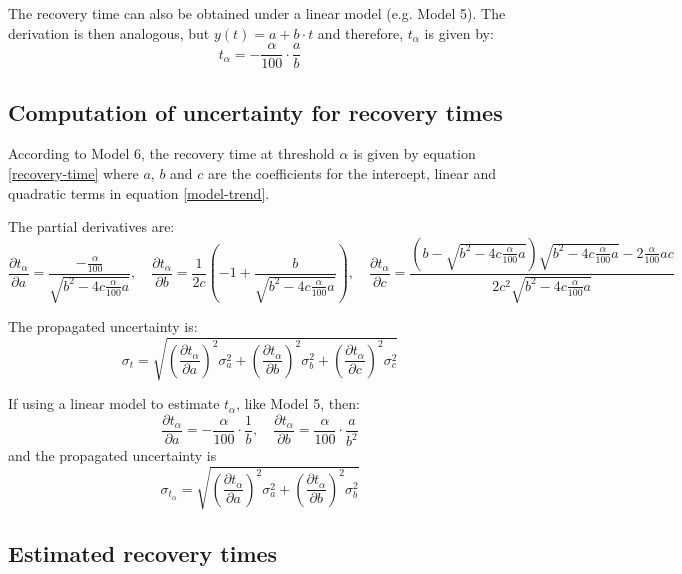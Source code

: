 \documentclass[fleqn,10pt]{wlscirep}
\begin{document}
The recovery time can also be obtained under a linear model (e.g. Model 5). The derivation is then analogous, but $y(t) = a + b\cdot t$ and therefore, $t_\alpha$ is given by:
\begin{equation}
    t_{\alpha} = -\dfrac{\alpha}{100}\cdot \dfrac{a}{b}
\end{equation}

\subsection{Computation of uncertainty for recovery times}

According to Model 6, the recovery time at threshold $\alpha$ is given by equation \eqref{recovery-time} where $a$, $b$ and $c$ are the coefficients for the intercept, linear and quadratic terms in equation \eqref{model-trend}.

The partial derivatives are:
\[
\frac{\partial t_\alpha}{\partial a} = \frac{-\frac{\alpha}{100}}{\sqrt{b^2 - 4c\frac{\alpha}{100} a}}, \quad
\frac{\partial t_\alpha}{\partial b} = \frac{1}{2c} \left( -1 + \frac{b}{\sqrt{b^2 - 4c\frac{\alpha}{100} a}} \right), \quad
\frac{\partial t_\alpha}{\partial c} = \frac{(b - \sqrt{b^2 - 4c\frac{\alpha}{100} a})\sqrt{b^2 - 4c\frac{\alpha}{100} a} - 2\frac{\alpha}{100} a c}{2c^2\sqrt{b^2 - 4c\frac{\alpha}{100} a}}
\]

The propagated uncertainty is:
\[
\sigma_t = \sqrt{
\left( \frac{\partial t_\alpha}{\partial a} \right)^2 \sigma_a^2 +
\left( \frac{\partial t_\alpha}{\partial b} \right)^2 \sigma_b^2 +
\left( \frac{\partial t_\alpha}{\partial c} \right)^2 \sigma_c^2}
\]

If using a linear model to estimate $t_{\alpha}$, like Model 5, then:
\[
\frac{\partial t_\alpha}{\partial a} = -\frac{\alpha}{100} \cdot \frac{1}{b}, \quad
\frac{\partial t_\alpha}{\partial b} = \dfrac{\alpha}{100}\cdot\dfrac{a}{b^2}
\]
and the propagated uncertainty is 
\begin{displaymath}
    \sigma_{t_\alpha} = \sqrt{
\left( \frac{\partial t_\alpha}{\partial a} \right)^2 \sigma_a^2 +
\left( \frac{\partial t_\alpha}{\partial b} \right)^2 \sigma_b^2 }
\end{displaymath}

\newpage

\subsection{Estimated recovery times}
\end{document}
